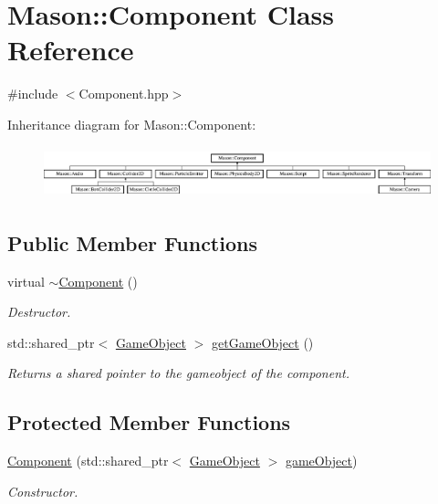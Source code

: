 \hypertarget{class_mason_1_1_component}{}\section{Mason\+:\+:Component Class Reference}
\label{class_mason_1_1_component}


{\ttfamily \#include $<$Component.\+hpp$>$}

Inheritance diagram for Mason\+:\+:Component\+:\begin{figure}[H]
\begin{center}
\leavevmode
\includegraphics[height=1.518987cm]{class_mason_1_1_component}
\end{center}
\end{figure}
\subsection*{Public Member Functions}
\begin{DoxyCompactItemize}
\item 
virtual \hyperlink{class_mason_1_1_component_ab8378fa275af98e568a7e91d33d867af}{$\sim$\+Component} ()
\begin{DoxyCompactList}\small\item\em Destructor. \end{DoxyCompactList}\item 
std\+::shared\+\_\+ptr$<$ \hyperlink{class_mason_1_1_game_object}{Game\+Object} $>$ \hyperlink{class_mason_1_1_component_a6c96ba73e4added598bfa975e000a3ea}{get\+Game\+Object} ()
\begin{DoxyCompactList}\small\item\em Returns a shared pointer to the gameobject of the component. \end{DoxyCompactList}\end{DoxyCompactItemize}
\subsection*{Protected Member Functions}
\begin{DoxyCompactItemize}
\item 
\hyperlink{class_mason_1_1_component_a19f394f7e3e940e7fc01d18d6a762d46}{Component} (std\+::shared\+\_\+ptr$<$ \hyperlink{class_mason_1_1_game_object}{Game\+Object} $>$ \hyperlink{class_mason_1_1_component_abaa67b569d0a70e26a4606f4a099a925}{game\+Object})
\begin{DoxyCompactList}\small\item\em Constructor. \end{DoxyCompactList}\end{DoxyCompactItemize}
